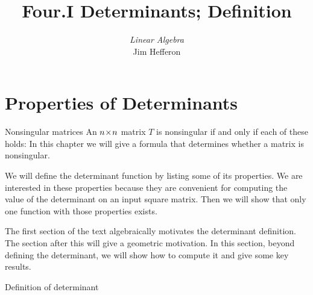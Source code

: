 \documentclass[10pt,t,serif,professionalfont]{beamer}
\title[Determinants] %
{Four.I Determinants; Definition}
\author{\textit{Linear Algebra} \\ {\small Jim Hef{}feron}}
\institute{
  \texttt{http://joshua.smcvt.edu/linearalgebra}
}
\date{}
\begin{document}
\begin{frame}
  \titlepage
\end{frame}




\section{Properties of Determinants}
\begin{frame}{Nonsingular matrices}
An \( n \! \times \! n \) matrix \( T \) is nonsingular if and only if
each of these holds:%
In this chapter we will give a formula that determines whether a
matrix is nonsingular.
\end{frame}




\begin{frame}
\end{frame}




\begin{frame}
We will define the determinant function by listing 
some of its properties.
We are interested in these properties 
because they are convenient for computing the value of the determinant
on an input square matrix. 
Then we will show that only one function with those properties exists.

\pause
\medskip
\no
The first section of the text algebraically motivates the 
determinant definition. 
The section after this will give a geometric motivation.
In this section, beyond defining the determinant, 
we will show how to compute it
and give some key results.
\end{frame}




\begin{frame}{Definition of determinant}

\pause 
{} 
\end{frame}
\end{document}
